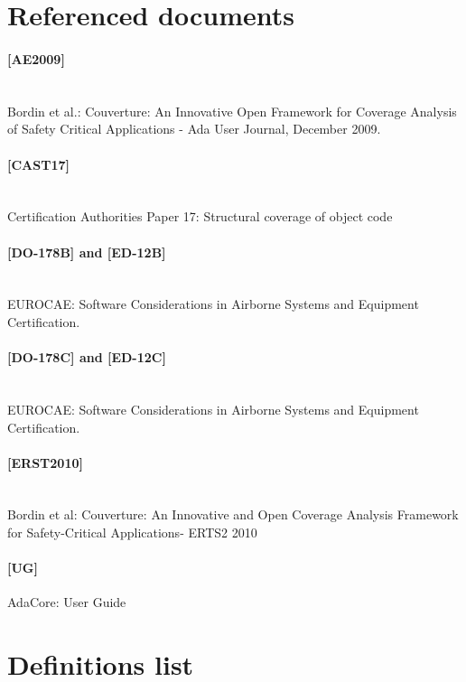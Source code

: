 \newcommand{\erts}{[ERST2010]\space}
\newcommand{\adaeurope}{[AE2009]\space}
\newcommand{\castseventeen}{[CAST17]\space}

\section{Referenced documents}
\paragraph*{\adaeurope} \ \\
Bordin et al.: Couverture: An Innovative Open Framework for Coverage Analysis of Safety Critical Applications - Ada User Journal, December 2009.
\paragraph*{\castseventeen} \ \\
Certification Authorities Paper 17: Structural coverage of object code
\paragraph*{[DO-178B] and [ED-12B]} \ \\
EUROCAE: Software Considerations in Airborne Systems and Equipment Certification.
\paragraph*{[DO-178C] and [ED-12C]} \ \\
EUROCAE: Software Considerations in Airborne Systems and Equipment Certification.
\paragraph*{\erts} \ \\
Bordin et al: Couverture: An Innovative and Open Coverage Analysis Framework for Safety-Critical Applications- ERTS2 2010
\paragraph*{[\xcov UG]}
AdaCore: \xcov User Guide

\section{Definitions list}

\paragraph*{\xcov} \ \\

